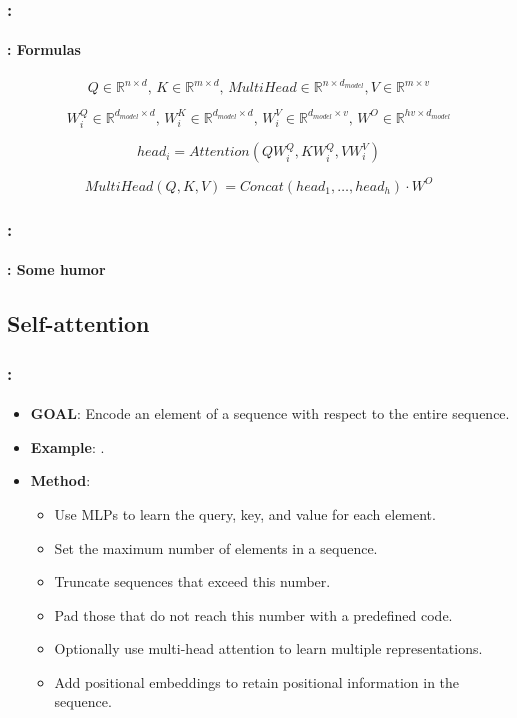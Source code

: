 \documentclass[xcolor=table]{beamer}
\begin{document}
\begin{frame}
	\frametitle{\insertshortsubtitle: \insertsection}
	\framesubtitle{\insertsubsection: Formulas}
	
	\[Q \in \mathbb{R}^{n \times d}, \, K \in \mathbb{R}^{m \times d}, \, MultiHead \in \mathbb{R}^{n \times d_{model}}, V \in \mathbb{R}^{m \times v} \]
	
	\[W^Q_i \in \mathbb{R}^{d_{model} \times d}, \,  W^K_i \in \mathbb{R}^{d_{model} \times d}, \, W^V_i \in \mathbb{R}^{d_{model} \times v}, \, W^O \in \mathbb{R}^{hv \times d_{model}}\]
	
	\[head_i = Attention(Q W^Q_i, K W^Q_i, V W^V_i)\]
	
	\[MultiHead(Q, K, V) = Concat(head_1, \ldots, head_h) \cdot W^O\]
	
	
\end{frame}

\begin{frame}
	\frametitle{\insertshortsubtitle: \insertsection}
	\framesubtitle{\insertsubsection: Some humor}
	
	\begin{center}
	\end{center}
	
\end{frame}



\subsection{Self-attention}

\begin{frame}
	\frametitle{\insertshortsubtitle: \insertsection}
	\framesubtitle{\insertsubsection}
	
	\begin{itemize}
		\item \textbf{GOAL}: Encode an element of a sequence with respect to the entire sequence.
		\item \textbf{Example}: .
		\item \textbf{Method}:
		\begin{itemize}
			\item Use MLPs to learn the query, key, and value for each element.
			\item Set the maximum number of elements in a sequence.
			\item Truncate sequences that exceed this number.
			\item Pad those that do not reach this number with a predefined code.
			\item Optionally use multi-head attention to learn multiple representations.
			\item Add positional embeddings to retain positional information in the sequence.
		\end{itemize}
	\end{itemize}
	
\end{frame}
\end{document}
